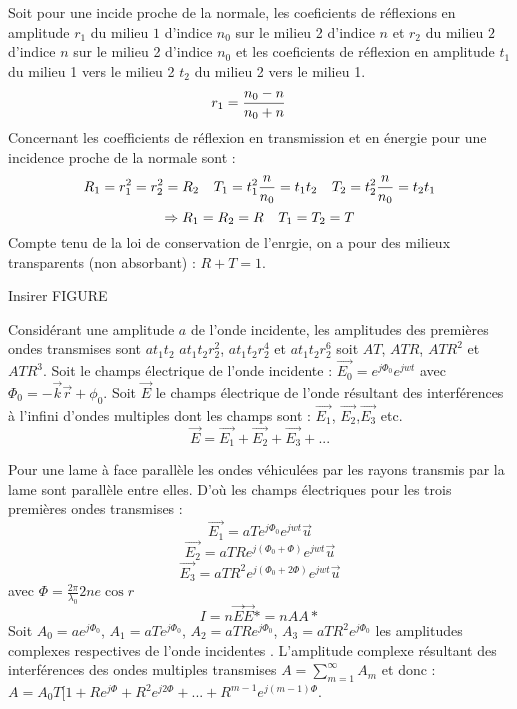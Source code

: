 \documentclass[a4paper,12pt]{article}
\theoremstyle{StyleTheo_will}
\theoremstyle{remark}
\begin{document}
Soit pour une incide proche de la normale, les coeficients de réflexions en amplitude $r_1$ du milieu $1$ d'indice $n_0$ sur le milieu 2 d'indice $n$ et $r_2$ du milieu $2$ d'indice $n$ sur le milieu 2 d'indice $n_0$ et les coeficients de réflexion en amplitude $t_1$ du milieu 1 vers le milieu 2 $t_2$ du milieu 2 vers le milieu 1. 
\[r_1 = \frac{n_0 - n}{n_0 +n} \verb|   |\]
Concernant les coefficients de réflexion en transmission et en énergie pour une incidence proche de la normale sont :
\[R_1 = r_1^2 = r_2^2 = R_2 \verb|  | T_1 = t_1^2 \frac{n}{n_0} = t_1t_2 \verb |  | T_2 = t_2^2 \frac{n}{n_0} =t_2t_1\]
\[\Rightarrow R_1 = R_2 = R \verb|  | T_1 = T_2 = T\]
Compte tenu de la loi de conservation de l'enrgie, on a pour des milieux transparents (non absorbant) : $R + T =1$.

Insirer FIGURE

Considérant une amplitude $a$ de l'onde incidente, les amplitudes des premières ondes transmises sont $at_1t_2$ $at_1t_2r_2^2$, $at_1t_2r_2^4$ et  $at_1t_2r_2^6$ soit $AT$, $ATR$, $ATR^2$ et $ATR^3$. Soit le champs électrique de l'onde incidente : $\overrightarrow{E_0} = e^{j\varPhi_0}e^{jwt}$ avec $\varPhi_0 = - \overrightarrow{k}\overrightarrow{r} + \phi_0$. Soit $\overrightarrow{E}$ le champs électrique de l'onde résultant des interférences à l'infini d'ondes multiples dont les champs sont : $\overrightarrow{E_1}$, $\overrightarrow{E_2}$,$\overrightarrow{E_3}$ etc. 
\[\overrightarrow{E} = \overrightarrow{E_1} + \overrightarrow{E_2} + \overrightarrow{E_3} + ... \]

Pour une lame à face parallèle les ondes véhiculées par les rayons transmis par la lame sont parallèle entre elles. D'où les champs électriques pour les trois premières ondes transmises : 
\[\overrightarrow{E_1} = aTe^{j\varPhi_0}e^{jwt}\overrightarrow{u}\] 
\[\overrightarrow{E_2} = aTRe^{j(\varPhi_0+ \varPhi)}e^{jwt}\overrightarrow{u}\] 
\[\overrightarrow{E_3} = aTR^2e^{j(\varPhi_0+ 2\varPhi)}e^{jwt}\overrightarrow{u}\] 
avec $\varPhi = \frac{2\pi}{\lambda_0} 2ne\cos r$
\[I = n\overrightarrow{E}\overrightarrow{E}* =nAA*\]
Soit $A_0 = ae^{j\varPhi_0}$, $A_1 = aTe^{j\varPhi_0}$, $A_2 = aTRe^{j\varPhi_0}$, $A_3 = aTR^2e^{j\varPhi_0}$ les amplitudes complexes respectives de l'onde incidentes . L'amplitude complexe résultant des interférences des ondes multiples transmises $A = \sum_{m=1}^\infty A_m$ et donc : $A = A_0T[1+ Re^{j\varPhi}+R^2e^{j2\varPhi} + ... + R^{m-1}e^{j(m-1)\varPhi}$.
\end{document}
